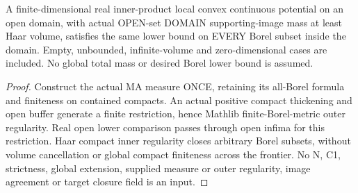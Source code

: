 \begin{lemma}
  \label{lem:domain-ma-lower-borel}
  \leanok
  A finite-dimensional real inner-product local convex continuous potential on
  an open domain, with actual OPEN-set DOMAIN supporting-image mass at least
  Haar volume, satisfies the same lower bound on EVERY Borel subset inside
  the domain. Empty, unbounded, infinite-volume and zero-dimensional cases
  are included. No global total mass or desired Borel lower bound is assumed.
\end{lemma}
\begin{proof}
  \leanok
  Construct the actual MA measure ONCE, retaining its all-Borel formula and
  finiteness on contained compacts. An actual positive compact thickening and
  open buffer generate a finite restriction, hence Mathlib finite-Borel-metric
  outer regularity. Real open lower comparison passes through open infima for
  this restriction. Haar compact inner regularity closes arbitrary Borel
  subsets, without volume cancellation or global compact finiteness across
  the frontier. No N, C1, strictness, global extension, supplied measure or
  outer regularity, image agreement or target closure field is an input.
\end{proof}

